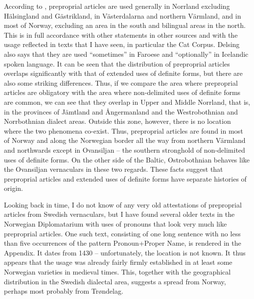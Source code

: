 \begin{styleBodytextC}
According to \citet[21]{Delsing2003a}, preproprial articles are used generally in Norrland excluding Hälsingland and Gästrikland, in Västerdalarna and northern Värmland, and in most of Norway, excluding an area in the south and bilingual areas in the north. This is in full accordance with other statements in other sources and with the usage reflected in texts that I have seen, in particular the Cat Corpus. Delsing also says that they are used “sometimes” in Faroese and “optionally” in Icelandic spoken language. It can be seen that the distribution of preproprial articles overlaps significantly with that of extended uses of definite forms, but there are also some striking differences. Thus, if we compare the area where preproprial articles are obligatory with the area where non-delimited uses of definite forms are common, we can see that they overlap in Upper and Middle Norrland, that is, in the provinces of Jämtland and Ångermanland and the Westrobothnian and Norrbothnian dialect areas. Outside this zone, however, there is no location where the two phenomena co-exist. Thus, preproprial articles are found in most of Norway and along the Norwegian border all the way from northern Värmland and northwards except in Ovansiljan – the southern stronghold of non-delimited uses of definite forms. On the other side of the Baltic, Ostrobothnian behaves like the Ovansiljan vernaculars in these two regards. These facts suggest that preproprial articles and extended uses of definite forms have separate histories of origin.

\end{styleBodytextC}

\begin{styleBodytextC}
Looking back in time, I do not know of any very old attestations of preproprial articles from Swedish vernaculars, but I have found several older texts in the Norwegian Diplomatarium with uses of pronouns that look very much like preproprial articles. One such text, consisting of one long sentence with no less than five occurrences of the pattern Pronoun+Proper Name, is rendered in the Appendix. It dates from 1430 – unfortunately, the location is not known. It thus appears that the usage was already fairly firmly established in at least some Norwegian varieties in medieval times. This, together with the geographical distribution in the Swedish dialectal area, suggests a spread from Norway, perhaps most probably from Trøndelag.

\end{styleBodytextC}

